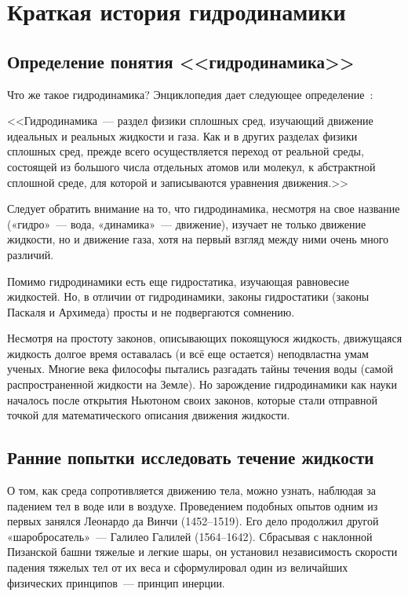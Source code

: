 
\section{Краткая история гидродинамики}

\subsection{Определение понятия <<гидродинамика>>}

Что же такое гидродинамика? Энциклопедия дает следующее определение~\cite{wiki}:

<<Гидродинамика~--- раздел физики сплошных сред, изучающий движение идеальных и реальных жидкости и газа.
Как и в других разделах физики сплошных сред, прежде всего осуществляется переход от реальной среды, 
состоящей из большого числа отдельных атомов или молекул, к абстрактной сплошной среде, для которой и 
записываются уравнения движения.>>

Следует обратить внимание на то, что гидродинамика, несмотря на свое название («гидро»~--- вода, 
«динамика»~--- движение), изучает не только движение жидкости, но и движение газа, хотя на первый 
взгляд между ними очень много различий.

Помимо гидродинамики есть еще гидростатика, изучающая равновесие жидкостей. Но, в отличии от 
гидродинамики, законы гидростатики (законы Паскаля и Архимеда) просты и не подвергаются сомнению.

Несмотря на простоту законов, описывающих покоящуюся жидкость, движущаяся жидкость долгое время 
оставалась (и всё еще остается) неподвластна умам ученых. Многие века философы пытались разгадать 
тайны течения воды (самой распространенной жидкости на Земле). Но зарождение гидродинамики как науки 
началось после открытия Ньютоном своих законов, которые стали отправной точкой для математического 
описания движения жидкости.

\subsection{Ранние попытки исследовать течение жидкости}

О том, как среда сопротивляется движению тела, можно узнать, наблюдая за падением тел в воде или в воздухе. 
Проведением подобных опытов одним из первых занялся Леонардо да Винчи (1452--1519). 
Его дело продолжил другой «шаробросатель»~--- Галилео Галилей (1564--1642). 
Сбрасывая с наклонной Пизанской башни тяжелые и легкие шары, он установил независимость 
скорости падения тяжелых тел от их веса и сформулировал один из величайших физических принципов~--- принцип инерции.

